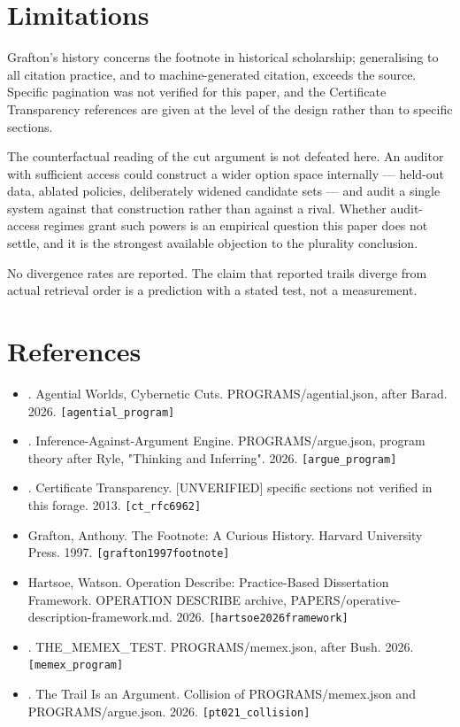 \documentclass[11pt,a4paper]{article}
\begin{document}
\section{Limitations}
Grafton's history concerns the footnote in historical scholarship; generalising to all citation practice, and to machine-generated citation, exceeds the source. Specific pagination was not verified for this paper, and the Certificate Transparency references are given at the level of the design rather than to specific sections.

The counterfactual reading of the cut argument is not defeated here. An auditor with sufficient access could construct a wider option space internally --- held-out data, ablated policies, deliberately widened candidate sets --- and audit a single system against that construction rather than against a rival. Whether audit-access regimes grant such powers is an empirical question this paper does not settle, and it is the strongest available objection to the plurality conclusion.

No divergence rates are reported. The claim that reported trails diverge from actual retrieval order is a prediction with a stated test, not a measurement.

\section*{References}\small
\begin{itemize}\setlength\itemsep{0pt}
\item [author unrecorded]. Agential Worlds, Cybernetic Cuts. PROGRAMS/agential.json, after Barad. 2026. \texttt{[agential\_program]}
\item [author unrecorded]. Inference-Against-Argument Engine. PROGRAMS/argue.json, program theory after Ryle, "Thinking and Inferring". 2026. \texttt{[argue\_program]}
\item [author unrecorded]. Certificate Transparency. [UNVERIFIED] specific sections not verified in this forage. 2013. \texttt{[ct\_rfc6962]}
\item Grafton, Anthony. The Footnote: A Curious History. Harvard University Press. 1997. \texttt{[grafton1997footnote]}
\item Hartsoe, Watson. Operation Describe: Practice-Based Dissertation Framework. OPERATION DESCRIBE archive, PAPERS/operative-description-framework.md. 2026. \texttt{[hartsoe2026framework]}
\item [author unrecorded]. THE\_MEMEX\_TEST. PROGRAMS/memex.json, after Bush. 2026. \texttt{[memex\_program]}
\item [author unrecorded]. The Trail Is an Argument. Collision of PROGRAMS/memex.json and PROGRAMS/argue.json. 2026. \texttt{[pt021\_collision]}
\end{itemize}\normalsize
\appendix
\end{document}

